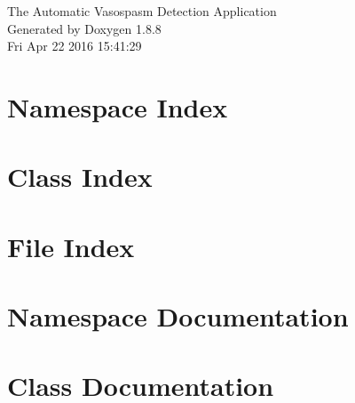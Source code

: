 \documentclass[twoside]{book}
\newcommand{\+}{\discretionary{\mbox{\scriptsize$\hookleftarrow$}}{}{}}
\newcommand{\clearemptydoublepage}{%
  \newpage{\pagestyle{empty}\cleardoublepage}%
}
\begin{document}
\hypersetup{pageanchor=false,
             bookmarks=true,
             bookmarksnumbered=true,
             pdfencoding=unicode
            }
\begin{titlepage}
\vspace*{7cm}
\begin{center}%
{\Large The Automatic Vasospasm Detection Application }\\
\vspace*{1cm}
{\large Generated by Doxygen 1.8.8}\\
\vspace*{0.5cm}
{\small Fri Apr 22 2016 15:41:29}\\
\end{center}
\end{titlepage}
\clearemptydoublepage
\tableofcontents
\clearemptydoublepage
{}
\hypersetup{pageanchor=true}

\chapter{Namespace Index}

\chapter{Class Index}

\chapter{File Index}

\chapter{Namespace Documentation}


\chapter{Class Documentation}






\end{document}
